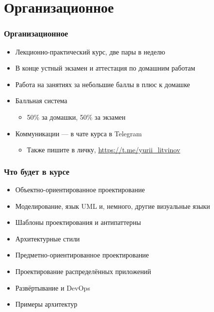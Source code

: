 \documentclass{../cscslides}
\begin{document}
    \frame{\titlepage}

    \section{Организационное}

    \begin{frame}
        \frametitle{Организационное}
        \begin{itemize}
            \item Лекционно-практический курс, две пары в неделю
            \item В конце устный экзамен и аттестация по домашним работам
            \item Работа на занятиях за небольшие баллы в плюс к домашке
            \item Балльная система
            \begin{itemize}
                \item 50\% за домашки, 50\% за экзамен
            \end{itemize}
            \item Коммуникации --- в чате курса в Telegram
            \begin{itemize}
                \item Также пишите в личку, \url{https://t.me/yurii_litvinov}
            \end{itemize}
        \end{itemize}
    \end{frame}

    \begin{frame}
        \frametitle{Что будет в курсе}
        \begin{itemize}
            \item Объектно-ориентированное проектирование
            \item Моделирование, язык UML и, немного, другие визуальные языки
            \item Шаблоны проектирования и антипаттерны
            \item Архитектурные стили
            \item Предметно-ориентированное проектирование
            \item Проектирование распределённых приложений
            \item Развёртывание и DevOps
            \item Примеры архитектур
        \end{itemize}
    \end{frame}
\end{document}
